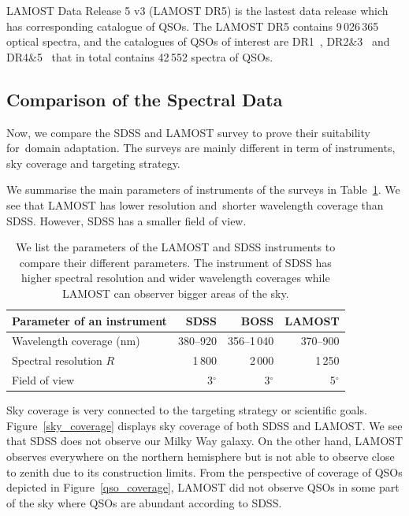 LAMOST Data Release 5 v3 (LAMOST DR5) is the lastest data release
which has corresponding catalogue of QSOs.
The LAMOST DR5 contains 9\,026\,365 optical spectra,
and the catalogues of QSOs of interest are DR1~\cite{ai2016}, DR2\&3~\cite{dong2018} and DR4\&5~\cite{yao2019}
that in total contains 42\,552 spectra of QSOs.

\subsection{Comparison of the Spectral Data}
\label{comparison}

Now, we compare the SDSS and LAMOST survey to prove their suitability for~domain adaptation.
The surveys are mainly different in term of instruments, sky coverage and targeting strategy.

We summarise the main parameters of instruments of the surveys in Table~\ref{telescopes_parameters}.
We see that LAMOST has lower resolution and~shorter wavelength coverage than SDSS.
However, SDSS has a smaller field of view.

\begin{table}
\begin{center}
\begin{tabular}{|l|r|r|r|}
	\hline
	Parameter of an instrument & SDSS & BOSS & LAMOST \\
	\hline \hline
	Wavelength coverage (nm) & 380--920 & 356--1\,040 & 370--900 \\
	\hline
	Spectral resolution \(R\) & 1\,800 & 2\,000 & 1\,250 \\
	\hline
	Field of view & 3\(^{\circ}\) & 3\(^{\circ}\) & 5\(^{\circ}\) \\
	\hline
\end{tabular}
\end{center}
\caption[Parameters of the LAMOST and SDSS instruments]{
	We list the parameters of the LAMOST and SDSS instruments
	to compare their different parameters.
	The instrument of SDSS has higher spectral resolution and wider wavelength coverages
	while LAMOST can observer bigger areas of the sky.
	}
\label{telescopes_parameters}
\end{table}

Sky coverage is very connected to the targeting strategy or scientific goals.
Figure~\ref{sky_coverage} displays sky coverage of both SDSS and LAMOST.
We see that SDSS does not observe our Milky Way galaxy.
On the other hand, LAMOST observes everywhere on the northern hemisphere
but is not able to observe close to zenith due to its construction limits.
From the perspective of coverage of QSOs depicted in Figure~\ref{qso_coverage},
LAMOST did not observe QSOs in some part of the sky where QSOs are abundant according to SDSS.

